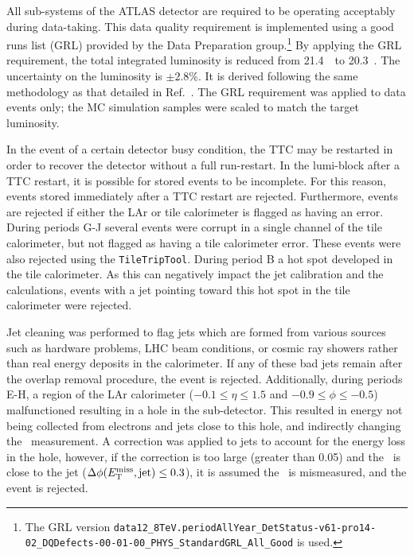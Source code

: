 All sub-systems of the ATLAS detector are required to be operating acceptably
during data-taking. 
This data quality requirement is implemented using a good runs list (GRL)
provided by the Data Preparation group.\footnote{The GRL version
\texttt{data12\_8TeV.periodAllYear\_DetStatus-v61-pro14-02\_DQDefects-00-01-00\_PHYS\_StandardGRL\_All\_Good}
is used.}
By applying the GRL requirement, the total integrated luminosity is reduced
from 21.4~\ifb\ to 20.3~\ifb.
The uncertainty on the luminosity is $\pm 2.8$\%.
It is derived following the same methodology as that detailed
in Ref.~\cite{Lumi}.
The GRL requirement was applied to data events only; the MC simulation samples
were scaled to match the target luminosity.

In the event of a certain detector busy condition, the TTC may be restarted in
order to recover the detector without a full run-restart. In the lumi-block
after a TTC restart, it is possible for stored events to be incomplete.
For this reason, events stored immediately after a TTC restart are rejected.
Furthermore, events are rejected if either the LAr or tile calorimeter is
flagged as having an error.
During periods G-J several events were corrupt in a single channel of the tile
calorimeter, but not flagged as having a tile calorimeter error.
These events were also rejected using the \texttt{TileTripTool}.
During period B a hot spot developed in the tile calorimeter.
As this can negatively impact the jet calibration and the \met calculations,
events with a jet pointing toward this hot spot in the tile calorimeter were
rejected.

Jet cleaning was performed to flag jets which are formed from various sources
such as hardware problems, LHC beam conditions, or cosmic ray showers rather
than real energy deposits in the calorimeter.
If any of these bad jets remain after the overlap removal procedure, the event
is rejected.
Additionally, during periods E-H, a region of the LAr
calorimeter ($-0.1\le\eta\le1.5$ and $-0.9\le\phi\le-0.5$) malfunctioned
resulting in a hole in the sub-detector.
This resulted in energy not being collected from electrons and jets close to
this hole, and indirectly changing the \met\ measurement.
A correction was applied to jets to account for the energy loss in the hole,
however, if the correction is too large (greater than 0.05) and the \met\ is
close to the jet ($\Delta\phi(E_{\mathrm{T}}^{\mathrm{miss}}, \text{jet}) \le 0.3$), it is assumed the
\met\ is mismeasured, and the event is rejected.

